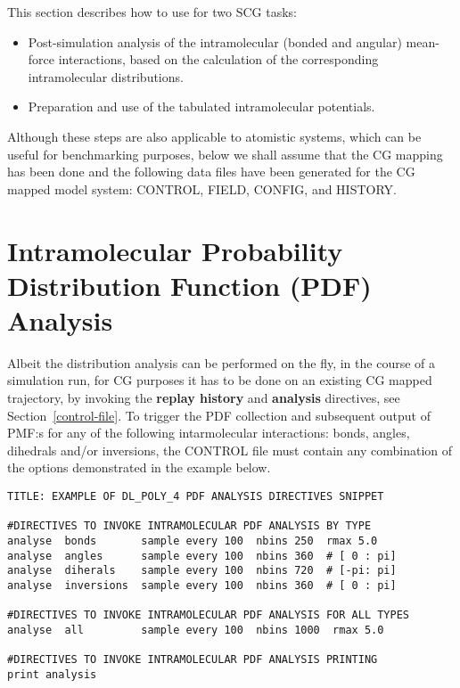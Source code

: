 This section describes how to use \D for two SCG tasks:

\begin{itemize}
\item Post-simulation analysis of the intramolecular (bonded and angular) 
mean-force interactions, based on the calculation of the corresponding 
intramolecular distributions. 
\item Preparation and use of the tabulated intramolecular potentials.
\end{itemize}

 Although these steps are also applicable to 
atomistic systems, which can be useful for benchmarking purposes, 
below we shall assume that the CG mapping has been done and the following 
data files have been generated for the CG mapped model system:
CONTROL, FIELD, CONFIG, and HISTORY.

\section{Intramolecular Probability Distribution Function (PDF) Analysis}
\label{IPDF-analysis}

Albeit the distribution analysis can be performed on the fly, 
in the course of a simulation run, for CG purposes it has 
to be done on an existing CG mapped trajectory, by invoking 
the {\bf replay history} and {\bf analysis} directives, 
see Section~\ref{control-file}.
To trigger the PDF collection and subsequent output of PMF:s 
for any of the following intarmolecular interactions: bonds, 
angles, dihedrals and/or inversions, the CONTROL file must 
contain any combination of the options demonstrated 
in the example below.

\begin{verbatim}
TITLE: EXAMPLE OF DL_POLY_4 PDF ANALYSIS DIRECTIVES SNIPPET

#DIRECTIVES TO INVOKE INTRAMOLECULAR PDF ANALYSIS BY TYPE
analyse  bonds       sample every 100  nbins 250  rmax 5.0
analyse  angles      sample every 100  nbins 360  # [ 0 : pi]
analyse  diherals    sample every 100  nbins 720  # [-pi: pi]
analyse  inversions  sample every 100  nbins 360  # [ 0 : pi]

#DIRECTIVES TO INVOKE INTRAMOLECULAR PDF ANALYSIS FOR ALL TYPES
analyse  all         sample every 100  nbins 1000  rmax 5.0

#DIRECTIVES TO INVOKE INTRAMOLECULAR PDF ANALYSIS PRINTING
print analysis
\end{verbatim}

